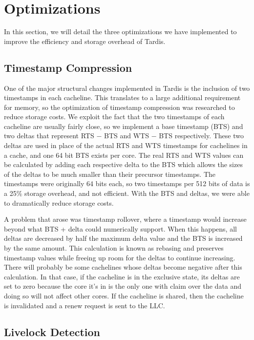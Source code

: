 \documentclass[12pt]{article}
\begin{document}
	\section{Optimizations} \label{sec:optimization}
	
	In this section, we will detail the three optimizations we have 
	implemented to improve the efficiency and storage overhead of Tardis.
	
	\subsection{Timestamp Compression}
	
	One of the major structural changes implemented in Tardis is the 
	inclusion of two timestamps in each cacheline. This translates to a 
	large additional requirement for memory, so the optimization of 
	timestamp compression was researched to reduce storage costs. We 
	exploit the fact that the two timestamps of each cacheline are usually 
	fairly close, so we implement a base timestamp (BTS) and two deltas 
	that represent RTS $-$ BTS and WTS $-$ BTS respectively. These two 
	deltas are used in place of the actual RTS and WTS timestamps for 
	cachelines in a cache, and one 64 bit BTS exists per core. The real 
	RTS and WTS values can be calculated by adding each respective delta 
	to the BTS which allows the sizes of the deltas to be much smaller 
	than their precursor timestamps. The timestamps were originally 64 
	bits each, so two timestamps per 512 bits of data is a 25\% storage 
	overhead, and not efficient.  With the BTS and deltas, we were able to 
	dramatically reduce storage costs. 
	
	A problem that arose was timestamp rollover, where a 
	timestamp would  increase beyond what BTS + delta could 
	numerically support. When this happens, all deltas are decreased by 
	half the maximum delta value and the BTS is increased by the same 
	amount. This calculation is known as rebasing and preserves timestamp 
	values while freeing up room for the deltas to continue increasing.  
	There will probably be some cachelines whose deltas become negative 
	after this calculation. In that case, if the cacheline is in the 
	exclusive state, its deltas are set to zero because the core it's in is the 
	only one with claim over the data and doing so will not affect other 
	cores. If the cacheline is shared, then the cacheline is invalidated 
	and a renew request is sent to the LLC. 
	
	\subsection{Livelock Detection} \label{sec:livelock-detection}
	
\end{document}
